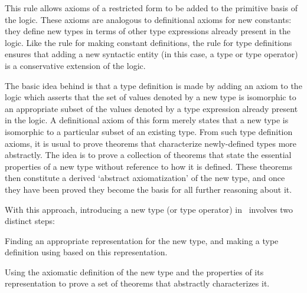 {{\noindent This rule allows
axioms of a restricted form to be added to the primitive basis of the logic.
These axioms are analogous to definitional axioms for new constants: they
define new types in terms of other type expressions already present in the
logic. Like the rule  for making constant definitions, 
the rule  
 for type definitions
ensures that adding a new syntactic entity (in this case, a type or 
type operator) is a conservative extension of the logic. 

The basic idea behind  is  that a  type definition is
made by  adding an  axiom to  the logic  which asserts  that the  set of values
denoted by a  new type  is isomorphic  to an  appropriate subset  of the values
denoted by  a type  expression already  present in  the logic.   A definitional
axiom of this form merely states  
that a  new type  is isomorphic  to a particular
subset of an existing type.  From such type definition  axioms, it  is usual to
prove theorems that characterize newly-defined types more abstractly.  The idea
is to prove a collection of theorems that state  the essential  properties of a
new type without reference to how it is defined.   These  theorems then
constitute a derived `abstract axiomatization' of the new type, and 
once  they have  been proved they
become the basis for all further reasoning about it.  

With this approach, introducing a new type (or type operator) in \HOL\
involves two distinct steps:

\setcounter{myenumi}{1}
\begin{list}{.}{
\setlength{\leftmargin}{10mm}
\setlength{\rightmargin}{5mm}
\setlength{\labelwidth}{3mm}
\setlength{\labelsep}{2mm}
\setlength{\listparindent}{0mm}
\setlength{\itemsep}{8pt plus1pt minus2pt}
\setlength{\topsep}{3mm}
\setlength{\parsep}{0mm}}
\setlength{\abovedisplayshortskip}{8pt plus1pt minus1pt} 
\setlength{\belowdisplayshortskip}{8pt plus1pt minus1pt}

\item Finding an appropriate representation for the new type, and making a type \mbox{definition} using  based
 on this representation.

\item Using the axiomatic definition of the new type and the properties of its
representation to prove a set of theorems that abstractly characterizes it.


\end{list}}}
